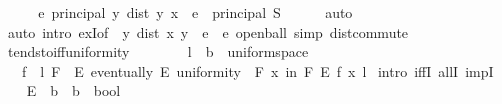 \begin{isabellebody}
\ \ \isamarkupfalse%
\ \isamarkupfalse%
\ {\isachardoublequoteopen}{\isasymexists}e{\isasymin}{\isacharbraceleft}{\kern0pt}{}{\isacharless}{\kern0pt}{\isachardot}{\kern0pt}{\isachardot}{\kern0pt}{\isacharbraceright}{\kern0pt}{\isachardot}{\kern0pt}\ principal\ {\isacharbraceleft}{\kern0pt}y{\isachardot}{\kern0pt}\ dist\ y\ x\ {\isacharless}{\kern0pt}\ e{\isacharbraceright}{\kern0pt}\ {\isasymle}\ principal\ S{\isachardoublequoteclose}\isanewline
\ \ \ \ \isamarkupfalse%
\ auto\isanewline
{}\isamarkupfalse%
\ {\isacharparenleft}{\kern0pt}auto\ intro{\isacharbang}{\kern0pt}{\isacharcolon}{\kern0pt}\ exI{\isacharbrackleft}{\kern0pt}of\ {\isacharunderscore}{\kern0pt}\ {\isachardoublequoteopen}{\isacharbraceleft}{\kern0pt}y{\isachardot}{\kern0pt}\ dist\ x\ y\ {\isacharless}{\kern0pt}\ e{\isacharbraceright}{\kern0pt}{\isachardoublequoteclose}\ \ e{\isacharbrackright}{\kern0pt}\ open{\isacharunderscore}{\kern0pt}ball\ simp{\isacharcolon}{\kern0pt}\ dist{\isacharunderscore}{\kern0pt}commute{\isacharparenright}{\kern0pt}%
\endisatagproof
{\isafoldproof}%
%
\isadelimproof
\isanewline
%
\endisadelimproof
\isanewline
\isanewline
{}\isamarkupfalse%
\ tendsto{\isacharunderscore}{\kern0pt}iff{\isacharunderscore}{\kern0pt}uniformity{\isacharcolon}{\kern0pt}\isanewline
\ \ \ \ %
\isanewline
\ \ \ l\ {\isacharcolon}{\kern0pt}{\isacharcolon}{\kern0pt}\ {\isacartoucheopen}{\isacharprime}{\kern0pt}b\ {\isacharcolon}{\kern0pt}{\isacharcolon}{\kern0pt}\ uniform{\isacharunderscore}{\kern0pt}space{\isacartoucheclose}\isanewline
\ \ \ {\isacartoucheopen}{\isacharparenleft}{\kern0pt}f\ {\isasymlonglongrightarrow}\ l{\isacharparenright}{\kern0pt}\ F\ {\isasymlongleftrightarrow}\ {\isacharparenleft}{\kern0pt}{\isasymforall}E{\isachardot}{\kern0pt}\ eventually\ E\ uniformity\ {\isasymlongrightarrow}\ {\isacharparenleft}{\kern0pt}{\isasymforall}\isactrlsub F\ x\ in\ F{\isachardot}{\kern0pt}\ E\ {\isacharparenleft}{\kern0pt}f\ x{\isacharcomma}{\kern0pt}\ l{\isacharparenright}{\kern0pt}{\isacharparenright}{\kern0pt}{\isacharparenright}{\kern0pt}{\isacartoucheclose}\isanewline
%
\isadelimproof
%
\endisadelimproof
%
\isatagproof
{}\isamarkupfalse%
\ {\isacharparenleft}{\kern0pt}intro\ iffI\ allI\ impI{\isacharparenright}{\kern0pt}\isanewline
\ \ \isamarkupfalse%
\ E\ {\isacharcolon}{\kern0pt}{\isacharcolon}{\kern0pt}\ {\isacartoucheopen}{\isacharparenleft}{\kern0pt}{\isacharprime}{\kern0pt}b\ {\isasymtimes}\ {\isacharprime}{\kern0pt}b{\isacharparenright}{\kern0pt}\ {\isasymRightarrow}\ bool{\isacartoucheclose}\isanewline

\end{isabellebody}
